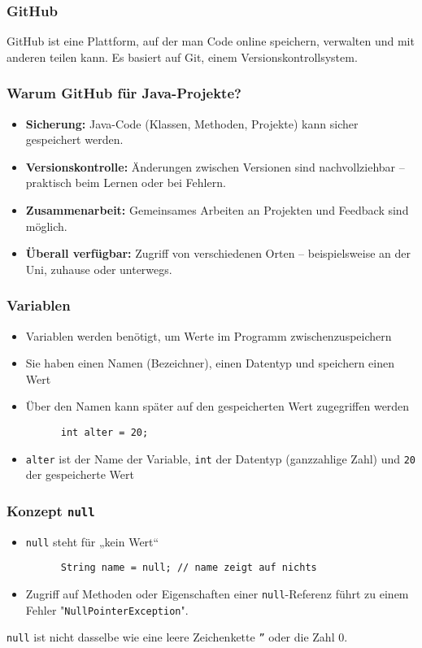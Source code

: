 \documentclass{../../presentation}
\begin{document}
\begin{frame}
  \frametitle{GitHub}
  GitHub ist eine Plattform, auf der man Code online speichern, verwalten und mit anderen teilen kann. Es basiert auf Git, einem Versionskontrollsystem.
\end{frame}

\begin{frame}
  \frametitle{Warum GitHub für Java-Projekte?}
  \pause
  \begin{itemize}
    \item \textbf{Sicherung:} Java-Code (Klassen, Methoden, Projekte) kann sicher gespeichert werden.
          \pause
    \item \textbf{Versionskontrolle:} Änderungen zwischen Versionen sind nachvollziehbar – praktisch beim Lernen oder bei Fehlern.
          \pause
    \item \textbf{Zusammenarbeit:} Gemeinsames Arbeiten an Projekten und Feedback sind möglich.
          \pause
    \item \textbf{Überall verfügbar:} Zugriff von verschiedenen Orten – beispielsweise an der Uni, zuhause oder unterwegs.
  \end{itemize}
\end{frame}

\begin{frame}[fragile]
  \frametitle{Variablen}
  \pause
  \begin{itemize}
    \item Variablen werden benötigt, um Werte im Programm zwischenzuspeichern
          \pause
    \item Sie haben einen Namen (Bezeichner), einen Datentyp und speichern einen Wert
          \pause
    \item Über den Namen kann später auf den gespeicherten Wert zugegriffen werden
          \pause
          \begin{verbatim}
      int alter = 20;
    \end{verbatim}
    \item \texttt{alter} ist der Name der Variable, \texttt{int} der Datentyp (ganzzahlige Zahl) und \texttt{20} der gespeicherte Wert
  \end{itemize}
\end{frame}

\begin{frame}[fragile]
  \frametitle{Konzept \texttt{null}}
  \pause
  \begin{itemize}
    \item \texttt{null} steht für „kein Wert“
          \begin{verbatim}
      String name = null; // name zeigt auf nichts
      \end{verbatim}
          \pause
    \item Zugriff auf Methoden oder Eigenschaften einer \texttt{null}-Referenz führt zu einem Fehler "\color{red}\texttt{NullPointerException}\color{black}".
  \end{itemize}
  \pause
  \achtung{} \texttt{null} ist nicht dasselbe wie eine leere Zeichenkette \texttt{''} oder die Zahl 0.
\end{frame}
\end{document}
